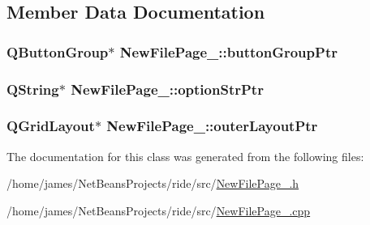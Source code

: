 \subsection{Member Data Documentation}
\hypertarget{class_new_file_page__2_a1eaed1480c571a3bb321bc13707056c8}{
\subsubsection[{button\-Group\-Ptr}]{\setlength{\rightskip}{0pt plus 5cm}Q\-Button\-Group$\ast$ New\-File\-Page\-\_\-::button\-Group\-Ptr\hspace{0.3cm}{\ttfamily [private]}}}\label{class_new_file_page__2_a1eaed1480c571a3bb321bc13707056c8}
\hypertarget{class_new_file_page__2_a8be9fd0cc47bdaa93967f604d8ca081a}{
\subsubsection[{option\-Str\-Ptr}]{\setlength{\rightskip}{0pt plus 5cm}Q\-String$\ast$ New\-File\-Page\-\_\-::option\-Str\-Ptr\hspace{0.3cm}{\ttfamily [private]}}}\label{class_new_file_page__2_a8be9fd0cc47bdaa93967f604d8ca081a}
\hypertarget{class_new_file_page__2_aeebed0ee7d06690f79843b0b926e937c}{
\subsubsection[{outer\-Layout\-Ptr}]{\setlength{\rightskip}{0pt plus 5cm}Q\-Grid\-Layout$\ast$ New\-File\-Page\-\_\-::outer\-Layout\-Ptr\hspace{0.3cm}{\ttfamily [private]}}}\label{class_new_file_page__2_aeebed0ee7d06690f79843b0b926e937c}


The documentation for this class was generated from the following files\-:\begin{DoxyCompactItemize}
\item 
/home/james/\-Net\-Beans\-Projects/ride/src/\hyperlink{_new_file_page__2_8h}{New\-File\-Page\-\_.\-h}\item 
/home/james/\-Net\-Beans\-Projects/ride/src/\hyperlink{_new_file_page__2_8cpp}{New\-File\-Page\-\_.\-cpp}\end{DoxyCompactItemize}

